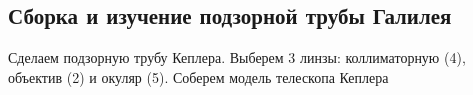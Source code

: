 \documentclass[a4paper,12pt]{article}
\theoremstyle{definition}
\begin{document}
\begin{figure}[H]
	\begin{minipage}[h]{0.5\linewidth}
	\end{minipage}
	\begin{minipage}[h]{0.5\linewidth}
	\end{minipage}
\end{figure}


\subsection{Сборка и изучение подзорной трубы Галилея}

Сделаем подзорную трубу Кеплера. Выберем 3 линзы: коллиматорную (4), объектив (2) и окуляр (5). Соберем модель телескопа Кеплера
\end{document}
